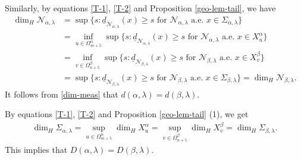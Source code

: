 \documentclass[reqno,11pt,graphicx,]{amsart}
\numberwithin{equation}{section}
\theoremstyle{plain}
\newcommand{\3}{\mathbf{3}}
\begin{document}
	Similarly, by equations \eqref{T-1}, \eqref{T-2} and Proposition \ref{geo-lem-tail}, we have
	\begin{align*}
		\dim_{H}\mathcal{N}_{\alpha,\lambda}&=\sup\{s: \underline{d}_{\mathcal{N}_{\alpha,\lambda}}(x)\ge s \text{ for  } \mathcal{N}_{\alpha,\lambda} \text{ a.e. }x\in\Sigma_{\alpha,\lambda}\}\\
		&=\inf_{u\in\Omega^{\alpha}_{m+5}}\sup\{s: \underline{d}_{\mathcal{N}_{\alpha,\lambda}}(x)\ge s \text{ for  } \mathcal{N}_{\alpha,\lambda} \text{ a.e. }x\in X^{\alpha}_{u}\}\\
		&=\inf_{v\in\Omega^{\beta}_{n+5}}\sup\{s: \underline{d}_{\mathcal{N}_{\beta,\lambda}}(x)\ge s \text{ for  } \mathcal{N}_{\beta,\lambda} \text{ a.e. }x\in X^{\beta}_{v}\}\\
		&=\sup\{s: \underline{d}_{\mathcal{N}_{\beta,\lambda}}(x)\ge s \text{ for  } \mathcal{N}_{\beta,\lambda} \text{ a.e. }x\in\Sigma_{\beta,\lambda}\}=\dim_{H}\mathcal{N}_{\beta,\lambda}.
	\end{align*}
	It follows from \eqref{dim-meas} that $d(\alpha,\lambda)=d(\beta,\lambda)$.
	
	By equations \eqref{T-1}, \eqref{T-2} and Proposition \ref{geo-lem-tail} (1), we get 
	\begin{align*}
		\dim_{H}\Sigma_{\alpha,\lambda}=\sup_{u\in\Omega^{\alpha}_{m+5}}\dim_HX^{\alpha}_{u}=\sup_{v\in\Omega^{\beta}_{n+5}}\dim_HX^{\beta}_{v}=\dim_{H}\Sigma_{\beta,\lambda}.
	\end{align*}
	This implies that $D(\alpha,\lambda)=D(\beta,\lambda)$.
	
\end{document}

